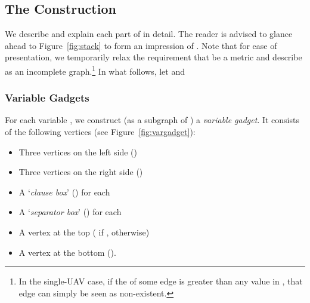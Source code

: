 \documentclass[envcountsame]{llncs}
\begin{document}
\subsection{The Construction}

We describe and explain each part of  in detail.
The reader is advised to glance ahead to Figure~\ref{fig:stack} to form an
impression of .  Note that for ease of presentation, we temporarily
relax the requirement that  be a metric and describe  as an incomplete graph.\footnote{In
  the single-UAV case, if the  of some edge is greater
  than any value in , that edge can simply be seen as
  non-existent.}  In what follows, let  and


\subsubsection{Variable Gadgets}
For each variable , we construct (as a subgraph of ) a \emph{variable gadget}.
It consists of the following vertices (see Figure~\ref{fig:vargadget}):
\begin{itemize}
\item Three vertices on the left side ()
\item Three vertices on the right side ()
\item A `\emph{clause box}' () for each 
\item A `\emph{separator box}' () for each 
\item A vertex at the top ( if ,  otherwise)
\item A vertex at the bottom ().
\end{itemize}
\end{document}
